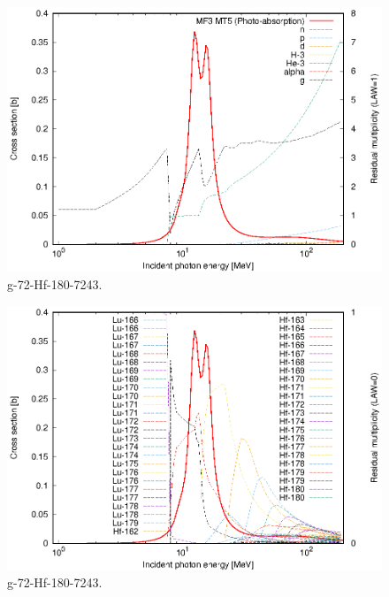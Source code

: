 \begin{figure}
 \includegraphics[width=\linewidth]{eps/g_72-Hf-180_7243.eps}
  \caption{g-72-Hf-180-7243.}
\end{figure}
\begin{figure}
 \includegraphics[width=\linewidth]{eps-law0/g_72-Hf-180_7243.eps}
 \caption{g-72-Hf-180-7243.}
\end{figure}
\newpage \clearpage

